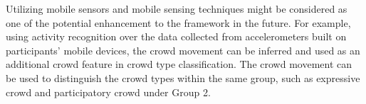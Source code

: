 Utilizing mobile sensors and mobile sensing techniques might be considered as one of the potential enhancement to the framework in the future. For example, using activity recognition over the data collected from accelerometers built on participants’ mobile devices, the crowd movement can be inferred and used as an additional crowd feature in crowd type classification. The crowd movement can be used to distinguish the crowd types within the same group, such as expressive crowd and participatory crowd under Group 2.